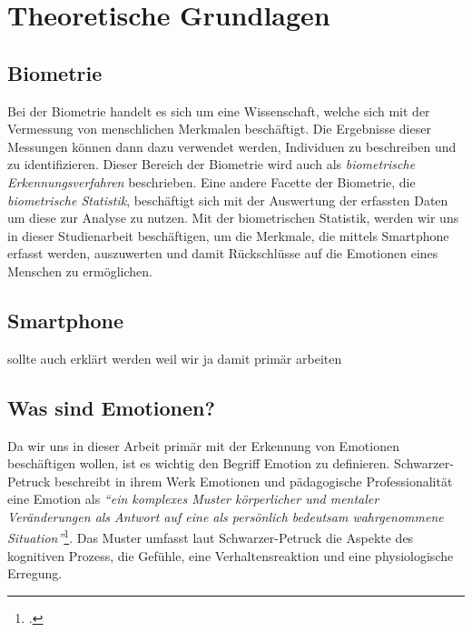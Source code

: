 \section{Theoretische Grundlagen}
\subsection{Biometrie}
Bei der Biometrie handelt es sich um eine Wissenschaft, welche sich mit der Vermessung von menschlichen Merkmalen beschäftigt.
Die Ergebnisse dieser Messungen können dann dazu verwendet werden, Individuen zu beschreiben und zu identifizieren. Dieser Bereich 
der Biometrie wird auch als \textit{biometrische Erkennungsverfahren} beschrieben. Eine andere Facette der Biometrie, die \textit{biometrische Statistik},
beschäftigt sich mit der Auswertung der erfassten Daten um diese zur Analyse zu nutzen.
Mit der biometrischen Statistik, werden wir uns in dieser Studienarbeit beschäftigen, um die Merkmale, die mittels 
Smartphone erfasst werden, auszuwerten und damit Rückschlüsse auf die Emotionen eines Menschen zu ermöglichen.
\subsection{Smartphone}
sollte auch erklärt werden weil wir ja damit primär arbeiten
\subsection{Was sind Emotionen?}
Da wir uns in dieser Arbeit primär mit der Erkennung von Emotionen beschäftigen wollen, ist es wichtig den Begriff Emotion zu definieren.
Schwarzer-Petruck beschreibt in ihrem Werk Emotionen und pädagogische Professionalität eine Emotion als \textit{``ein komplexes
Muster körperlicher und mentaler Veränderungen als Antwort auf eine als persönlich bedeutsam wahrgenommene Situation''}\footcite[S.51 Z.20ff]{Sch13}.
Das Muster umfasst laut Schwarzer-Petruck die Aspekte des kognitiven Prozess, die Gefühle, eine Verhaltensreaktion und eine physiologische Erregung.
